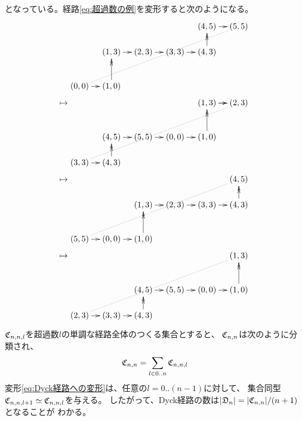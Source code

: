 {\begin{itemize}
	\end{itemize} %
	となっている。経路\eqref{eq:超過数の例}を変形すると次のようになる。
	\begin{equation*}\begin{split}
		& \xymatrix@R=1ex@C=1em{
			& & & & (4,5) \ar[r] & (5,5) \\
			\\
			& (1,3) \ar[r] & (2,3) \ar[r] & (3,3) \ar[r] & (4,3) \ar@{>>}[uu] \\
			\\
			\\
			(0,0) \ar[r] \ar@{.}[rrrrruuuuu] & (1,0) \ar@{>>}[uuu] \\
		} \\
		\mapsto & \xymatrix@R=1ex@C=1em{
			& & & & (1,3) \ar[r] \ar[r] & (2,3) \\
			\\
			\\
			& (4,5) \ar[r] & (5,5) \ar[r] & (0,0) \ar[r] & (1,0) \ar@{>>}[uuu] \\
			\\
			(3,3) \ar[r] \ar@{.}[rrrrruuuuu] & (4,3) \ar@{>>}[uu] \\
		} \\
		\mapsto & \xymatrix@R=1ex@C=1em{
			& & & & & (4,5) \\
			\\
			& & (1,3) \ar[r] & (2,3) \ar[r] & (3,3) \ar[r] & (4,3) \ar@{>>}[uu] \\
			\\
			\\
			(5,5) \ar[r] \ar@{.}[rrrrruuuuu] & (0,0) \ar[r] & (1,0) \ar@{>>}[uuu] \\
		} \\
		\mapsto & \xymatrix@R=1ex@C=1em{
			& & & & & (1,3) \\
			\\
			\\
			& & (4,5) \ar[r] & (5,5) \ar[r] & (0,0) \ar[r] & (1,0) \ar@{>>}[uuu] \\
			\\
			(2,3) \ar[r] \ar@{.}[rrrrruuuuu] & (3,3) \ar[r] & (4,3) \ar@{>>}[uu] \\
		}
	\end{split}\end{equation*}
	${\mathfrak C}_{n,n,l}$を超過数$l$の単調な経路全体のつくる集合とすると、
	${\mathfrak C}_{n,n}$は次のように分類され、
	\begin{equation*}\begin{split}
		{\mathfrak C}_{n,n} = \sum_{l\in0..n}{\mathfrak C}_{n,n,l}
	\end{split}\end{equation*}
	変形\eqref{eq:Dyck経路への変形}は、任意の$l=0..(n-1)$に対して、
	集合同型${\mathfrak C}_{n,n,l+1}\simeq{\mathfrak C}_{n,n,l}$を与える。
	したがって、Dyck経路の数は$|{\mathfrak D}_n|=|{\mathfrak C}_{n,n}|/(n+1)$となることが
	わかる。
}
